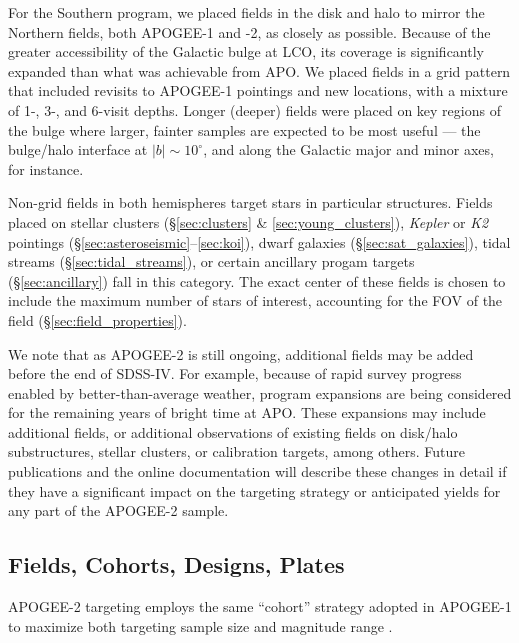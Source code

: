 \documentclass[12pt,twocolumn]{emulateapj}
\begin{document}
For the Southern program, we placed fields in the disk and halo to mirror the Northern fields, both APOGEE-1 and -2, as closely as possible.  
Because of the greater accessibility of the Galactic bulge at LCO,
its coverage is significantly expanded than what was achievable from APO.
We placed fields in a grid pattern that included revisits to APOGEE-1 pointings
and new locations, with a mixture of 1-, 3-, and 6-visit depths.  Longer (deeper)
fields were placed on key regions of the bulge where larger, fainter samples are expected
to be most useful --- the bulge/halo interface at $|b| \sim 10^\circ$, 
and along the Galactic %
major and minor axes, for instance.

Non-grid fields in both hemispheres target stars in particular structures.
Fields placed on stellar clusters (\S\ref{sec:clusters} \& \ref{sec:young_clusters}), 
{\it Kepler} or {\it K2} pointings (\S\ref{sec:asteroseismic}--\ref{sec:koi}), 
dwarf galaxies (\S\ref{sec:sat_galaxies}), tidal streams (\S\ref{sec:tidal_streams}), 
or certain ancillary progam targets (\S\ref{sec:ancillary}) fall in this category.
The exact center of these fields is chosen to include the maximum number of stars
of interest, accounting for the FOV of the field (\S\ref{sec:field_properties}).

We note that as APOGEE-2 is still ongoing, additional fields may be added before the end of SDSS-IV.  For example, because of rapid survey progress enabled by better-than-average weather, program expansions are being considered for the remaining years of bright time at APO.  These expansions may include additional fields, or additional observations of existing fields on disk/halo substructures, stellar clusters, or calibration targets, among others.  Future publications and the online documentation will describe these changes in detail if they have a significant impact on the targeting strategy or anticipated yields for any part of the APOGEE-2 sample.

\subsection{Fields, Cohorts, Designs, Plates}
\label{sec:design_defs}

APOGEE-2 targeting employs the same ``cohort'' strategy adopted in APOGEE-1 to maximize
both targeting sample size and magnitude range \citep[][]{Zasowski_2013_apogeetargeting}.
\end{document}
